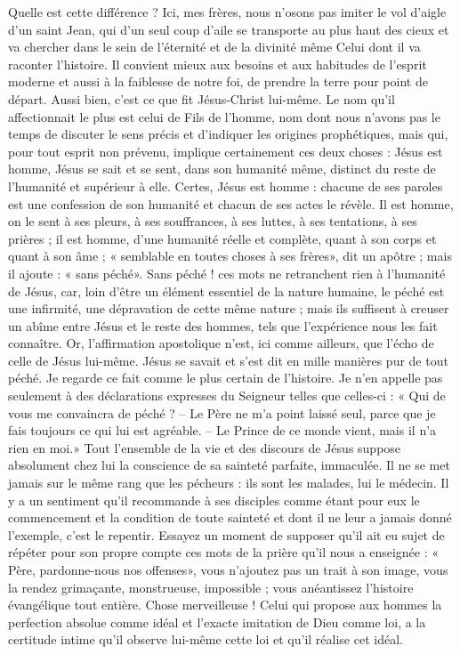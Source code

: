 Quelle est cette différence ? Ici, mes frères, nous n’osons pas imiter le vol d’aigle d’un saint Jean, qui d’un seul coup d’aile se transporte au plus haut des cieux et va chercher dans le sein de l’éternité et de la divinité même Celui dont il va raconter l’histoire. Il convient mieux aux besoins et aux habitudes de l’esprit moderne et aussi à la faiblesse de notre foi, de prendre la terre pour point de départ. Aussi bien, c’est ce que fit Jésus-Christ lui-même. Le nom qu’il affectionnait le plus est celui de Fils de l’homme, nom dont nous n’avons pas le temps de discuter le sens précis et d’indiquer les origines prophétiques, mais qui, pour tout esprit non prévenu, implique certainement ces deux choses : Jésus est homme, Jésus se sait et se sent, dans son humanité même, distinct du reste de l’humanité et supérieur à elle. Certes, Jésus est homme : chacune de ses paroles est une confession de son humanité et chacun de ses actes le révèle. Il est homme, on le sent à ses pleurs, à ses souffrances, à ses luttes, à ses tentations, à ses prières ; il est homme, d’une humanité réelle et complète, quant à son corps et quant à son âme ; « semblable en toutes choses à ses frères», dit un apôtre ; mais il ajoute : « sans péché». Sans péché ! ces mots ne retranchent rien à l’humanité de Jésus, car, loin d’être un élément essentiel de la nature humaine, le péché est une infirmité, une dépravation de cette même nature ; mais ils suffisent à creuser un abîme entre Jésus et le reste des hommes, tels que l’expérience nous les fait connaître. Or, l’affirmation apostolique n’est, ici comme ailleurs, que l’écho de celle de Jésus lui-même. Jésus se savait et s’est dit en mille manières pur de tout péché. Je regarde ce fait comme le plus certain de l’histoire. Je n’en appelle pas seulement à des déclarations expresses du Seigneur telles que celles-ci : « Qui de vous me convaincra de péché ? – Le Père ne m’a point laissé seul, parce que je fais toujours ce qui lui est agréable. – Le Prince de ce monde vient, mais il n’a rien en moi.» Tout l’ensemble de la vie et des discours de Jésus suppose absolument chez lui la conscience de sa sainteté parfaite, immaculée. Il ne se met jamais sur le même rang que les pécheurs : ils sont les malades, lui le médecin. Il y a un sentiment qu’il recommande à ses disciples comme étant pour eux le commencement et la condition de toute sainteté et dont il ne leur a jamais donné l’exemple, c’est le repentir. Essayez un moment de supposer qu’il ait eu sujet de répéter pour son propre compte ces mots de la prière qu’il nous a enseignée : « Père, pardonne-nous nos offenses», vous n’ajoutez pas un trait à son image, vous la rendez grimaçante, monstrueuse, impossible ; vous anéantissez l’histoire évangélique tout entière. Chose merveilleuse ! Celui qui propose aux hommes la perfection absolue comme idéal et l’exacte imitation de Dieu comme loi, a la certitude intime qu’il observe lui-même cette loi et qu’il réalise cet idéal.

